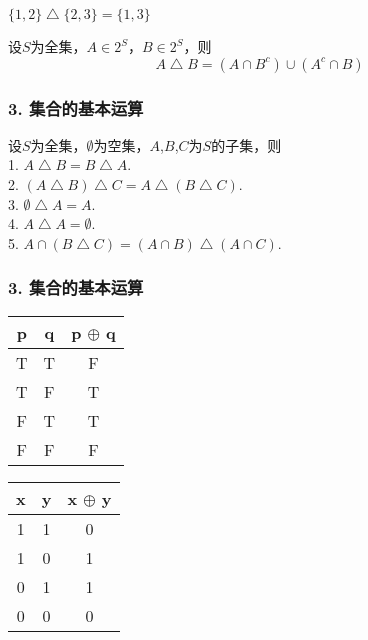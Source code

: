 \documentclass{beamer}
\begin{document}
\begin{CJK*}{UTF8}{gbsn}
\begin{frame}
\begin{minipage}{0.29\linewidth}
  \end{minipage}\pause
    \begin{Ex}
        $\{1,2\} \bigtriangleup \{2,3\} = \{1,3\}$
      \end{Ex}
      \pause
      \begin{Thm}
        设$S$为全集，$A\in 2^S$，$B\in 2^S$，则
        \begin{equation*}
          A \bigtriangleup B = (A \cap B^c)\cup (A^c \cap B)
        \end{equation*}
      \end{Thm}
\end{frame}

\begin{frame}
  \frametitle{3. 集合的基本运算}
  \begin{Thm}
设$S$为全集，$\emptyset$为空集，$A$,$B$,$C$为$S$的子集，则\\
1. $A \bigtriangleup B = B \bigtriangleup A$.\\
2. $(A \bigtriangleup B) \bigtriangleup C = A \bigtriangleup (B \bigtriangleup C)$.\\
3. $\emptyset \bigtriangleup A = A$.\\
4. $A \bigtriangleup A = \emptyset$.\\
5. $A \cap (B \bigtriangleup C) = (A \cap B) \bigtriangleup (A \cap C)$.\\ 
  \end{Thm}
\end{frame}

\begin{frame}
  \frametitle{3. 集合的基本运算}
  \begin{tabular}{cc|c}
    p& q& p $\oplus$ q\\
    \hline
    T&T&F\\
    T&F&T\\
    F&T&T\\
    F&F&F\\
  \end{tabular}

  \vspace{1cm}\pause
    \begin{tabular}{cc|c}
    x& y& x $\oplus$ y\\
    \hline
    1&1&0\\
    1&0&1\\
    0&1&1\\
    0&0&0\\
    \end{tabular}
\end{frame}


\end{CJK*}
\end{document}
